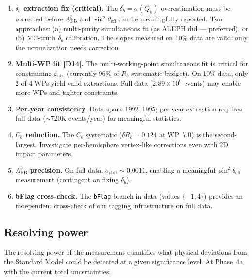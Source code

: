 \documentclass[11pt,a4paper]{article}
\begin{document}
\begin{enumerate}
\item \textbf{$\delta_b$ extraction fix (critical).} The $\delta_b = \sigma(Q_h)$
overestimation must be corrected before $A_\mathrm{FB}^b$ and
$\sin^2\theta_\mathrm{eff}$ can be meaningfully reported. Two approaches:
(a) multi-purity simultaneous fit (as ALEPH did --- preferred), or
(b) MC-truth $\delta_b$ calibration. The slopes measured on 10\% data are valid;
only the normalization needs correction.

\item \textbf{Multi-WP fit [D14].} The multi-working-point simultaneous fit is
critical for constraining $\varepsilon_\mathrm{uds}$ (currently 96\% of $R_b$
systematic budget). On 10\% data, only 2 of 4 WPs yield valid extractions.
Full data ($2.89 \times 10^6$ events) may enable more WPs and tighter constraints.

\item \textbf{Per-year consistency.} Data spans 1992--1995; per-year extraction
requires full data ($\sim 720$K events/year) for meaningful statistics.

\item \textbf{$C_b$ reduction.} The $C_b$ systematic ($\delta R_b = 0.124$ at WP~7.0)
is the second-largest. Investigate per-hemisphere vertex-like corrections even
with 2D impact parameters.

\item \textbf{$A_\mathrm{FB}^b$ precision.} On full data,
$\sigma_\mathrm{stat} \sim 0.0011$, enabling a meaningful
$\sin^2\theta_\mathrm{eff}$ measurement (contingent on fixing $\delta_b$).

\item \textbf{bFlag cross-check.} The \texttt{bFlag} branch in data (values $\{-1, 4\}$)
provides an independent cross-check of our tagging infrastructure on full data.
\end{enumerate}

\subsection{Resolving power}
\label{sec:resolving_power}

The resolving power of the measurement quantifies what physical deviations from the
Standard Model could be detected at a given significance level. At Phase~4a with the
current total uncertainties:
\end{document}
